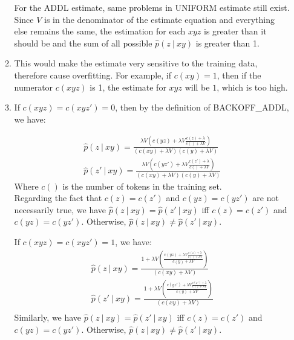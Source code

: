 \documentclass[10pt]{article}
\begin{document}
\begin{enumerate}
\begin{enumerate}
            For the ADDL estimate, same problems in UNIFORM estimate still exist. Since $V$ is in the denominator of the estimate equation and everything else remains the same, the estimation for each $xyz$ is greater than it should be and the sum of all possible $\hat{p}(z\ |\ xy)$ is greater than 1.
            
            \item
            This would make the estimate very sensitive to the training data, therefore cause overfitting. For example, if $c(xy) = 1$, then if the numerator $c(xyz)$ is 1, the estimate for $xyz$ will be $1$, which is too high.
            
            \item
            If $c(xyz) = c(xyz') = 0$, then by the definition of BACKOFF\_ADDL, we have:
            
            \begin{gather*}
                \hat{p}(z\ |\ xy) =  \frac{\lambda V (c(yz) + \lambda V \frac{c(z) + \lambda}{c() + \lambda V})}{(c(xy) + \lambda V)(c(y) + \lambda V)}\\
                \hat{p}(z'\ |\ xy) =  \frac{\lambda V (c(yz') + \lambda V \frac{c(z') + \lambda}{c() + \lambda V})}{(c(xy) + \lambda V)(c(y) + \lambda V)}
            \end{gather*}
            Where $c()$ is the number of tokens in the training set.\\
            Regarding the fact that $c(z) = c(z')$ and $c(yz) = c(yz')$ are not necessarily true, we have $\hat{p}(z\ |\ xy) = \hat{p}(z'\ |\ xy)$ iff $c(z) = c(z')$ and $c(yz) = c(yz')$. Otherwise, $\hat{p}(z\ |\ xy) \neq\hat{p}(z'\ |\ xy)$.
            
            If $c(xyz) = c(xyz') = 1$, we have:
            \begin{gather*}
                \hat{p}(z\ |\ xy) =  \frac{1 + \lambda V (\frac{c(yz) + \lambda V \frac{c(z) + \lambda}{c() + \lambda V}}{c(y) + \lambda V})}{(c(xy) + \lambda V)}\\
                \hat{p}(z'\ |\ xy) =  \frac{1 + \lambda V (\frac{c(yz') + \lambda V \frac{c(z') + \lambda}{c() + \lambda V}}{c(y) + \lambda V})}{(c(xy) + \lambda V)}\\            
            \end{gather*}
            Similarly, we have $\hat{p}(z\ |\ xy) = \hat{p}(z'\ |\ xy)$ iff  $c(z) = c(z')$ and $c(yz) = c(yz')$. Otherwise, $\hat{p}(z\ |\ xy) \neq\hat{p}(z'\ |\ xy)$.
            

\end{enumerate}
\end{enumerate}
\end{document}

